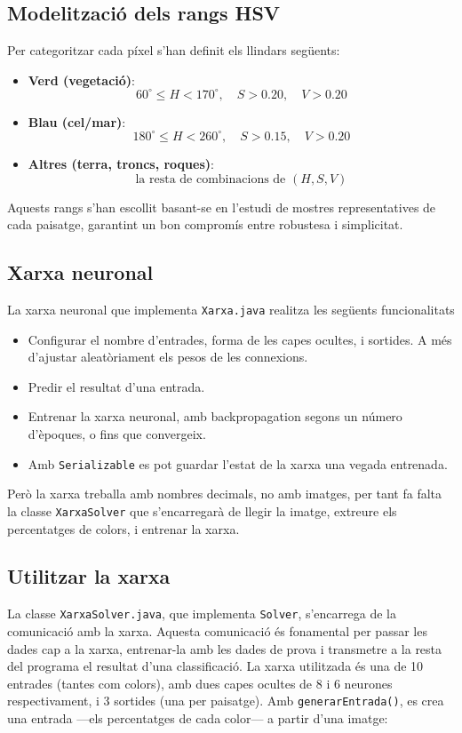 \documentclass{ieeetj}
\begin{document}
\subsection{Modelització dels rangs HSV}
Per categoritzar cada píxel s’han definit els llindars següents:
\begin{itemize}
  \item \textbf{Verd (vegetació)}:
    \[
      60^\circ \le H < 170^\circ,\quad S > 0.20,\quad V > 0.20
    \]
  \item \textbf{Blau (cel/mar)}:
    \[
      180^\circ \le H < 260^\circ,\quad S > 0.15,\quad V > 0.20
    \]
  \item \textbf{Altres (terra, troncs, roques)}:
    \[
      \text{la resta de combinacions de }(H,S,V)
    \]
\end{itemize}
Aquests rangs s’han escollit basant-se en l’estudi de mostres representatives de cada paisatge, garantint un bon compromís entre robustesa i simplicitat.

\subsection{Xarxa neuronal}
La xarxa neuronal que implementa \texttt{Xarxa.java} realitza les següents funcionalitats
\begin{itemize}
    \item Configurar el nombre d'entrades, forma de les capes ocultes, i sortides. A més d'ajustar aleatòriament els pesos de les connexions.
    \item Predir el resultat d'una entrada.
    \item Entrenar la xarxa neuronal, amb backpropagation\cite{backpropagation} segons un número d'èpoques, o fins que convergeix.
    \item Amb \texttt{Serializable} es pot guardar l'estat de la xarxa una vegada entrenada.
\end{itemize}
Però la xarxa treballa amb nombres decimals, no amb imatges, per tant fa falta la classe \texttt{XarxaSolver} que s'encarregarà de llegir la imatge, extreure els percentatges de colors, i entrenar la xarxa.

\subsection{Utilitzar la xarxa}
La classe \texttt{XarxaSolver.java}, que implementa \texttt{Solver}, s'encarrega de la comunicació amb la xarxa. Aquesta comunicació és fonamental per passar les dades cap a la xarxa, entrenar-la amb les dades de prova i transmetre a la resta del programa el resultat d'una classificació.  
La xarxa utilitzada és una de 10 entrades (tantes com colors), amb dues capes ocultes de 8 i 6 neurones respectivament, i 3 sortides (una per paisatge).  
Amb \texttt{generarEntrada()}, es crea una entrada —els percentatges de cada color— a partir d'una imatge:
\end{document}
